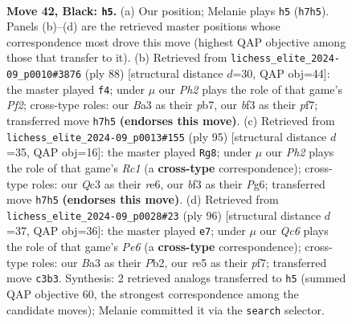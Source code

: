 \documentclass[11pt]{article}
\begin{document}
\clearpage

\begin{figure}[p]\centering
\begin{subfigure}{0.46\textwidth}\centering
\resizebox{\linewidth}{!}{%
\newchessgame
\chessboard[
  setfen={8/pp4kp/6p1/4R1P1/5P1P/b1q2BK1/8/8 b - - 0 42},
  showmover=false,
  pgfstyle=straightmove, color=movearrow, markmove={h7-h5}
]}
\caption{}
\end{subfigure}\hfill
\begin{subfigure}{0.46\textwidth}\centering
\resizebox{\linewidth}{!}{%
\newchessgame
\chessboard[
  setfen={8/pp1Q1pk1/4r1p1/4P2p/7P/6P1/5PK1/8 w - - 6 45},
  showmover=false,
  pgfstyle=straightmove, color=movearrow, markmove={f2-f4}
]}
\caption{}
\end{subfigure}
\\[4pt]
\begin{subfigure}{0.46\textwidth}\centering
\resizebox{\linewidth}{!}{%
\newchessgame
\chessboard[
  setfen={2r5/8/4R1pk/7p/1bPpB2P/3P2PK/8/8 b - - 6 48},
  showmover=false,
  pgfstyle=straightmove, color=movearrow, markmove={c8-g8}
]}
\caption{}
\end{subfigure}\hfill
\begin{subfigure}{0.46\textwidth}\centering
\resizebox{\linewidth}{!}{%
\newchessgame
\chessboard[
  setfen={8/1pk2p1r/p1b1P3/8/5PP1/2Q3K1/1P6/8 w - - 0 49},
  showmover=false,
  pgfstyle=straightmove, color=movearrow, markmove={e6-e7}
]}
\caption{}
\end{subfigure}
\caption{\textbf{Move 42, Black: \texttt{h5}.} (a) Our position; Melanie plays \texttt{h5} (\texttt{h7h5}). Panels (b)--(d) are the retrieved master positions whose correspondence most drove this move (highest QAP objective among those that transfer to it). (b) Retrieved from \texttt{lichess\_elite\_2024-09\_p0010\#3876} (ply 88) [structural distance $d$=30, QAP obj=44]: the master played \texttt{f4}; under $\mu$ our \emph{Ph2} plays the role of that game's \emph{Pf2}; cross-type roles: our \emph{B}a3 as their \emph{p}b7, our \emph{b}f3 as their \emph{p}f7; transferred move \texttt{h7h5} \textbf{(endorses this move)}. (c) Retrieved from \texttt{lichess\_elite\_2024-09\_p0013\#155} (ply 95) [structural distance $d$=35, QAP obj=16]: the master played \texttt{Rg8}; under $\mu$ our \emph{Ph2} plays the role of that game's \emph{Rc1} (a \textbf{cross-type} correspondence); cross-type roles: our \emph{Q}c3 as their \emph{r}e6, our \emph{b}f3 as their \emph{P}g6; transferred move \texttt{h7h5} \textbf{(endorses this move)}. (d) Retrieved from \texttt{lichess\_elite\_2024-09\_p0028\#23} (ply 96) [structural distance $d$=37, QAP obj=36]: the master played \texttt{e7}; under $\mu$ our \emph{Qc6} plays the role of that game's \emph{Pe6} (a \textbf{cross-type} correspondence); cross-type roles: our \emph{B}a3 as their \emph{P}b2, our \emph{r}e5 as their \emph{p}f7; transferred move \texttt{c3b3}. Synthesis: 2 retrieved analogs transferred to \texttt{h5} (summed QAP objective 60, the strongest correspondence among the candidate moves); Melanie committed it via the \texttt{search} selector.}
\label{fig:thought-m83}
\end{figure}
\end{document}
